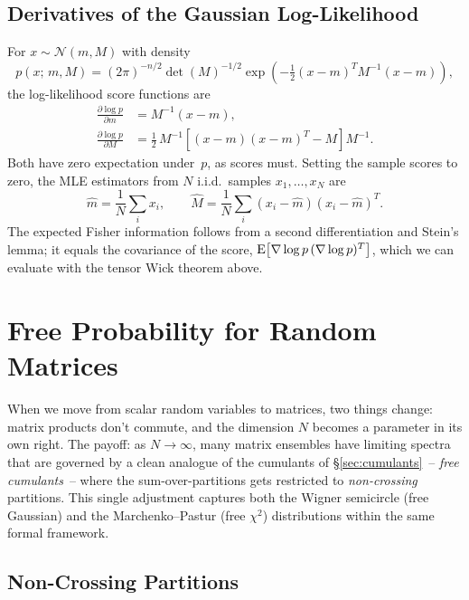 \subsection{Derivatives of the Gaussian Log-Likelihood}

For $x \sim \mathcal{N}(m, M)$ with density
\[
   p(x;\, m, M) = (2\pi)^{-n/2} \det(M)^{-1/2} \exp\!\left(-\tfrac{1}{2}(x-m)^T M^{-1} (x-m)\right),
\]
the log-likelihood score functions are
\begin{align*}
   \frac{\partial \log p}{\partial m} &= M^{-1}(x - m),
   \\
   \frac{\partial \log p}{\partial M} &= \tfrac{1}{2}\, M^{-1}\!\left[(x-m)(x-m)^T - M\right]\! M^{-1}.
\end{align*}
Both have zero expectation under~$p$, as scores must. Setting the sample scores to zero, the MLE estimators from $N$ i.i.d.\ samples $x_1, \dots, x_N$ are
\[
   \hat m = \frac{1}{N} \sum_i x_i,
   \qquad
   \hat M = \frac{1}{N} \sum_i (x_i - \hat m)(x_i - \hat m)^T.
\]
The expected Fisher information follows from a second differentiation and Stein's lemma; it equals the covariance of the score, $\mathrm{E}\!\left[\nabla \log p \, (\nabla \log p)^T\right]$, which we can evaluate with the tensor Wick theorem above.

\section{Free Probability for Random Matrices}

When we move from scalar random variables to matrices, two things change: matrix products don't commute, and the dimension $N$ becomes a parameter in its own right. The payoff: as $N \to \infty$, many matrix ensembles have limiting spectra that are governed by a clean analogue of the cumulants of \S\ref{sec:cumulants}~-- \emph{free cumulants}~-- where the sum-over-partitions gets restricted to \emph{non-crossing} partitions. This single adjustment captures both the Wigner semicircle (free Gaussian) and the Marchenko--Pastur (free $\chi^2$) distributions within the same formal framework.

\newcommand{\arcdiag}[2]{%
  \mathord{\begin{tikzpicture}[baseline=-1pt, inner sep=0pt, thin, x=7pt, y=7pt]
    \foreach \i in {1,...,#1} {\fill (\i, 0) circle (0.8pt);}
    #2
  \end{tikzpicture}}%
}
\newcommand{\arcc}[2]{\draw (#1, 0) to[bend left=60, looseness=1.3] (#2, 0);}

\subsection{Non-Crossing Partitions}

